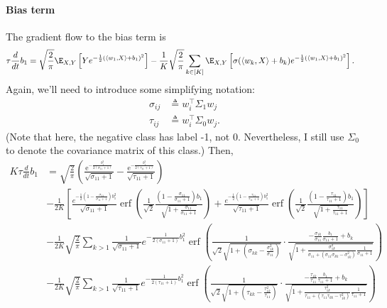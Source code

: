 \documentclass{article}
\begin{document}
\paragraph*{Bias term}
The gradient flow to the bias term is
\begin{align*}
  \tau \frac{d}{d t} b_1
  &= \sqrt{\frac{2}{\pi}} \E_{X,Y} \left[ Y e^{-\frac{1}{2} ( \langle w_1, X \rangle + b_1 )^2 } \right]
  - \frac{1}{K} \sqrt{\frac{2}{\pi}} \sum_{k\in[K]} \E_{X,Y} \left[ \sigma( \langle w_k, X \rangle + b_k ) e^{-\frac{1}{2} ( \langle w_1, X \rangle + b_1 )^2} \right].
\end{align*}
Again, we'll need to introduce some simplifying notation:
\begin{align*}
  \sigma_{ij} &\triangleq w_i^\top \Sigma_1 w_j \\
  \tau_{ij} &\triangleq w_i^\top \Sigma_0 w_j.
\end{align*}
(Note that here, the negative class has label -1, not 0.
Nevertheless, I still use $\Sigma_0$ to denote the covariance matrix of this class.)
Then,
\begin{align*}
  K \tau \frac{d}{d t} b_1
  &= \sqrt{\frac{2}{\pi}} \left( \frac{\mathrm{e}^{-\frac{b_1^2}{2({\sigma}_{11}+1)}}}{\sqrt{{\sigma}_{11}+1}} - \frac{\mathrm{e}^{-\frac{b_1^2}{2({\tau}_{11}+1)}}}{\sqrt{{\tau}_{11}+1}} \right) \\
  & -\frac{1}{2K} \left[ \frac{e^{-\frac{1}{2}\left(1-\frac{\sigma_{11}}{\sigma_{11}+1}\right)b_{1}^{2}}}{\sqrt{\sigma_{11}+1}}\operatorname{erf}\left(\frac{1}{\sqrt{2}}\frac{\left(1-\frac{\sigma_{11}}{\sigma_{11}+1}\right)b_{1}}{\sqrt{1+\frac{\sigma_{11}}{\sigma_{11}+1}}}\right) + \frac{e^{-\frac{1}{2}\left(1-\frac{\tau_{11}}{\tau_{11}+1}\right)b_{1}^{2}}}{\sqrt{\tau_{11}+1}}\operatorname{erf}\left(\frac{1}{\sqrt{2}}\frac{\left(1-\frac{\tau_{11}}{\tau_{11}+1}\right)b_{1}}{\sqrt{1+\frac{\tau_{11}}{\tau_{11}+1}}}\right) \right] \\
  & -\frac{1}{2K} \sqrt{\frac{2}{\pi}} \sum_{k>1} \frac{1}{\sqrt{\sigma_{11}+1}}e^{-\frac{1}{2\left(\sigma_{11}+1\right)}b_{1}^{2}}\operatorname{erf}\left(\frac{1}{\sqrt{2}\sqrt{1+\left(\sigma_{kk}-\frac{\sigma_{1k}^{2}}{\sigma_{11}}\right)}}\cdot\frac{-\frac{\sigma_{1k}}{\sigma_{11}}\frac{b_{1}}{\sigma_{11}+1}+b_{k}}{\sqrt{1+\frac{\sigma_{1k}^{2}}{\sigma_{11}+\left(\sigma_{11}\sigma_{kk}-\sigma_{1k}^{2}\right)}\frac{1}{\sigma_{11}+1}}}\right) \\
  & -\frac{1}{2K} \sqrt{\frac{2}{\pi}} \sum_{k>1} \frac{1}{\sqrt{\tau_{11}+1}}e^{-\frac{1}{2\left(\tau_{11}+1\right)}b_{1}^{2}}\operatorname{erf}\left(\frac{1}{\sqrt{2}\sqrt{1+\left(\tau_{kk}-\frac{\tau_{1k}^{2}}{\tau_{11}}\right)}}\cdot\frac{-\frac{\tau_{1k}}{\tau_{11}}\frac{b_{1}}{\tau_{11}+1}+b_{k}}{\sqrt{1+\frac{\tau_{1k}^{2}}{\tau_{11}+\left(\tau_{11}\tau_{kk}-\tau_{1k}^{2}\right)}\frac{1}{\tau_{11}+1}}}\right)
\end{align*}
\end{document}
